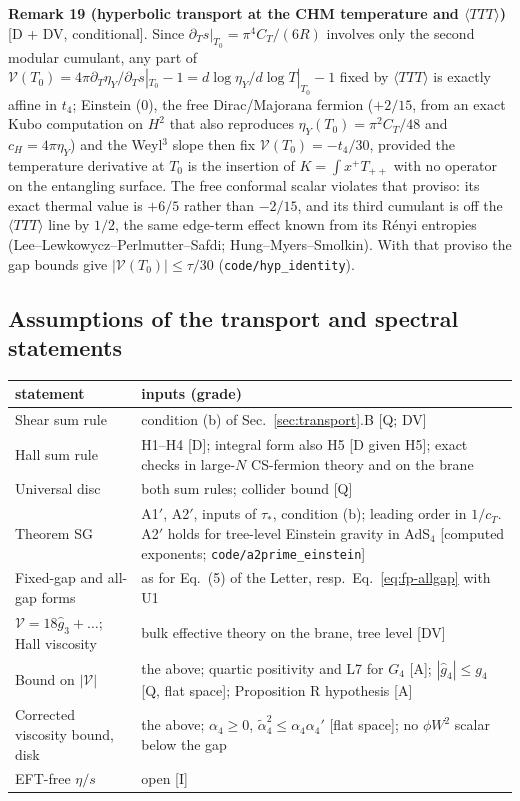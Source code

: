 \textbf{Remark 19 (hyperbolic transport at the CHM temperature and $\langle TTT\rangle$)} [D + DV, conditional]. Since $\partial_Ts|_{T_0}=\pi^4C_T/(6R)$
involves only the second modular cumulant, any part of $\mathcal V(T_0)=4\pi\partial_T\eta_Y/\partial_Ts|_{T_0}-1=d\log\eta_Y/d\log T|_{T_0}-1$ fixed by
$\langle TTT\rangle$ is exactly affine in $t_4$; Einstein ($0$), the free Dirac/Majorana fermion ($+2/15$, from an exact Kubo computation on $H^2$ that also
reproduces $\eta_Y(T_0)=\pi^2C_T/48$ and $c_H=4\pi\eta_Y$) and the Weyl$^3$ slope then fix $\mathcal V(T_0)=-t_4/30$, provided the temperature derivative at
$T_0$ is the insertion of $K=\int x^+T_{++}$ with no operator on the entangling surface. The free conformal scalar violates that proviso: its exact
thermal value is $+6/5$ rather than $-2/15$, and its third cumulant is off the $\langle TTT\rangle$ line by $1/2$, the same edge-term effect known from its
Rényi entropies (Lee--Lewkowycz--Perlmutter--Safdi; Hung--Myers--Smolkin). With that proviso the gap bounds give $|\mathcal V(T_0)|\le\tau/30$
(\texttt{code/hyp\_identity}).

\subsection{Assumptions of the transport and spectral statements}
\begin{center}
\begin{tabular}{L{6.2cm}L{9.6cm}}
statement & inputs (grade)\\\hline
Shear sum rule & condition (b) of Sec.~\ref{sec:transport}.B [Q; DV]\\
Hall sum rule & H1--H4 [D]; integral form also H5 [D given H5]; exact checks in large-$N$ CS-fermion theory and on the brane\\
Universal disc & both sum rules; collider bound [Q]\\
Theorem SG & A1$'$, A2$'$, inputs of $\tau_*$, condition (b); leading order in $1/c_T$. A2$'$ holds for tree-level Einstein gravity in AdS$_4$ [computed exponents; \texttt{code/a2prime\_einstein}]\\
Fixed-gap and all-gap forms & as for Eq.~(5) of the Letter, resp.\ Eq.~\eqref{eq:fp-allgap} with U1\\
$\mathcal V=18\hat g_3+\dots$; Hall viscosity & bulk effective theory on the brane, tree level [DV]\\
Bound on $|\mathcal V|$ & the above; quartic positivity and L7 for $G_4$ [A]; $|\hat g_4|\le g_4$ [Q, flat space]; Proposition R hypothesis [A]\\
Corrected viscosity bound, disk & the above; $\alpha_4\ge0$, $\tilde\alpha_4^2\le\alpha_4\alpha_4'$ [flat space]; no $\phi W^2$ scalar below the gap\\
EFT-free $\eta/s$ & open [I]\\
\end{tabular}
\end{center}
